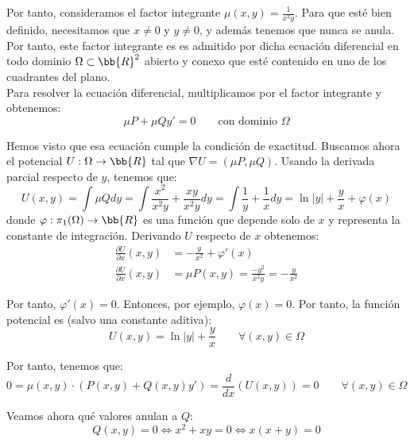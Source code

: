\begin{ejercicio}
    Por tanto, consideramos el factor integrante $\mu(x,y)=\frac{1}{x^2y}$. Para que esté bien definido, necesitamos que $x\neq 0$ y $y\neq 0$, y además tenemos que nunca se anula. Por tanto, este factor integrante es es admitido por dicha ecuación diferencial en todo dominio $\Omega\subset \bb{R}^2$ abierto y conexo que esté contenido en uno de los cuadrantes del plano.\\

    Para resolver la ecuación diferencial, multiplicamos por el factor integrante y obtenemos:
    \begin{equation*}
        \mu P + \mu Q y' = 0 \qquad \text{con dominio }\Omega
    \end{equation*}

    Hemos visto que esa ecuación cumple la condición de exactitud. Buscamos ahora el potencial $U:\Omega\to\bb{R}$ tal que $\nabla U=(\mu P,\mu Q)$. Usando la derivada parcial respecto de $y$, tenemos que:
    \begin{equation*}
        U(x,y)=\int \mu Q dy = \int \frac{x^2}{x^2y} + \frac{xy}{x^2y} dy = \int \frac{1}{y} + \frac{1}{x} dy = \ln |y| + \frac{y}{x} + \varphi(x)
    \end{equation*}
    donde $\varphi:\pi_1(\Omega)\to\bb{R}$ es una función que depende solo de $x$ y representa la constante de integración. Derivando $U$ respecto de $x$ obtenemos:
    \begin{align*}
        \frac{\partial U}{\partial x}(x,y)&=-\frac{y}{x^2}+\varphi'(x)\\
        \frac{\partial U}{\partial x}(x,y)&=\mu P(x,y)=\frac{-y^2}{x^2y}= -\frac{y}{x^2}
    \end{align*}

    Por tanto, $\varphi'(x)=0$. Entonces, por ejemplo, $\varphi(x)=0$. Por tanto, la función potencial es (salvo una constante aditiva):
    \begin{equation*}
        U(x,y)=\ln |y| + \frac{y}{x}\qquad \forall (x,y)\in\Omega
    \end{equation*}

    Por tanto, tenemos que:
    \begin{equation*}
        0=\mu(x,y)\cdot (P(x,y)+Q(x,y)y')=\dfrac{d}{dx}\left(U(x,y)\right)=0\qquad \forall (x,y)\in\Omega
    \end{equation*}

    Veamos ahora qué valores anulan a $Q$:
    \begin{equation*}
        Q(x,y)=0 \Longleftrightarrow
        x^2+xy=0 \Longleftrightarrow x(x+y)=0
    \end{equation*}


\end{ejercicio}
